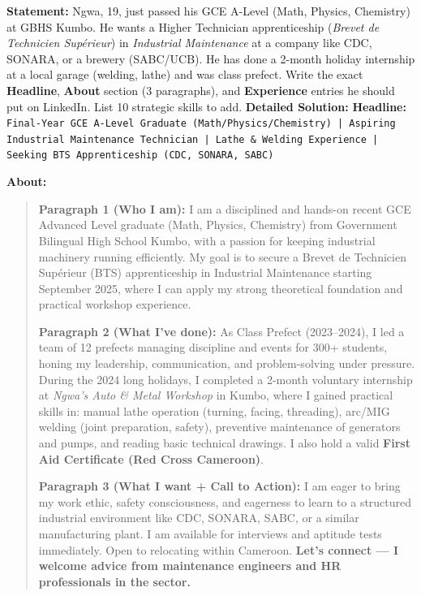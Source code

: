 \documentclass[11pt]{article}
\begin{document}
\begin{exoresolu}
    \textbf{Statement:} Ngwa, 19, just passed his GCE A-Level (Math, Physics, Chemistry) at GBHS Kumbo. He wants a Higher Technician apprenticeship (\textit{Brevet de Technicien Supérieur}) in \textit{Industrial Maintenance} at a company like CDC, SONARA, or a brewery (SABC/UCB). He has done a 2-month holiday internship at a local garage (welding, lathe) and was class prefect. Write the exact \textbf{Headline}, \textbf{About} section (3 paragraphs), and \textbf{Experience} entries he should put on LinkedIn. List 10 strategic skills to add.
    \tcblower
    \textbf{Detailed Solution:}
    \textbf{Headline:}
    \texttt{Final-Year GCE A-Level Graduate (Math/Physics/Chemistry) | Aspiring Industrial Maintenance Technician | Lathe \& Welding Experience | Seeking BTS Apprenticeship (CDC, SONARA, SABC)}

    \textbf{About:}
    \begin{quote}
    \textbf{Paragraph 1 (Who I am):} I am a disciplined and hands-on recent GCE Advanced Level graduate (Math, Physics, Chemistry) from Government Bilingual High School Kumbo, with a passion for keeping industrial machinery running efficiently. My goal is to secure a Brevet de Technicien Supérieur (BTS) apprenticeship in Industrial Maintenance starting September 2025, where I can apply my strong theoretical foundation and practical workshop experience.

    \textbf{Paragraph 2 (What I've done):} As Class Prefect (2023–2024), I led a team of 12 prefects managing discipline and events for 300+ students, honing my leadership, communication, and problem-solving under pressure. During the 2024 long holidays, I completed a 2-month voluntary internship at \textit{Ngwa's Auto \& Metal Workshop} in Kumbo, where I gained practical skills in: manual lathe operation (turning, facing, threading), arc/MIG welding (joint preparation, safety), preventive maintenance of generators and pumps, and reading basic technical drawings. I also hold a valid \textbf{First Aid Certificate (Red Cross Cameroon)}.

    \textbf{Paragraph 3 (What I want + Call to Action):} I am eager to bring my work ethic, safety consciousness, and eagerness to learn to a structured industrial environment like CDC, SONARA, SABC, or a similar manufacturing plant. I am available for interviews and aptitude tests immediately. Open to relocating within Cameroon. \textbf{Let's connect — I welcome advice from maintenance engineers and HR professionals in the sector.}
    \end{quote}


\end{exoresolu}
\end{document}
